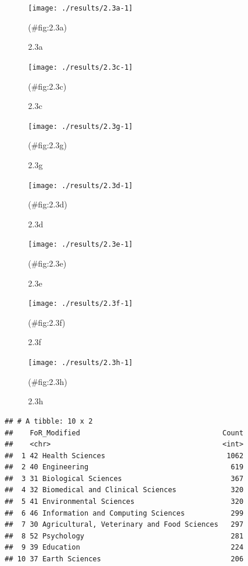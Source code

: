 \documentclass[
]{article}
\begin{document}
\begin{figure}[H]

{\centering \texttt{[image: ./results/2.3a-1]} 

}

\caption{2.3a}(\#fig:2.3a)
\end{figure}

\begin{figure}[H]

{\centering \texttt{[image: ./results/2.3c-1]} 

}

\caption{2.3c}(\#fig:2.3c)
\end{figure}

\begin{figure}[H]

{\centering \texttt{[image: ./results/2.3g-1]} 

}

\caption{2.3g}(\#fig:2.3g)
\end{figure}

\begin{figure}[H]

{\centering \texttt{[image: ./results/2.3d-1]} 

}

\caption{2.3d}(\#fig:2.3d)
\end{figure}

\begin{figure}[H]

{\centering \texttt{[image: ./results/2.3e-1]} 

}

\caption{2.3e}(\#fig:2.3e)
\end{figure}

\begin{figure}[H]

{\centering \texttt{[image: ./results/2.3f-1]} 

}

\caption{2.3f}(\#fig:2.3f)
\end{figure}

\begin{figure}[H]

{\centering \texttt{[image: ./results/2.3h-1]} 

}

\caption{2.3h}(\#fig:2.3h)
\end{figure}

\begin{verbatim}
## # A tibble: 10 x 2
##    FoR_Modified                                  Count
##    <chr>                                         <int>
##  1 42 Health Sciences                             1062
##  2 40 Engineering                                  619
##  3 31 Biological Sciences                          367
##  4 32 Biomedical and Clinical Sciences             320
##  5 41 Environmental Sciences                       320
##  6 46 Information and Computing Sciences           299
##  7 30 Agricultural, Veterinary and Food Sciences   297
##  8 52 Psychology                                   281
##  9 39 Education                                    224
## 10 37 Earth Sciences                               206
\end{verbatim}
\end{document}
